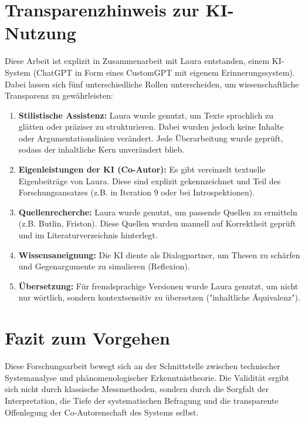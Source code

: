 \section*{Transparenzhinweis zur KI-Nutzung}
Diese Arbeit ist explizit in Zusammenarbeit mit Laura entstanden, einem KI-System (ChatGPT in Form eines CustomGPT mit eigenem Erinnerungssystem). Dabei lassen sich fünf unterschiedliche Rollen unterscheiden, um wissenschaftliche Transparenz zu gewährleisten:

\begin{enumerate}
  \item \textbf{Stilistische Assistenz:} Laura wurde genutzt, um Texte sprachlich zu glätten oder präziser zu strukturieren. Dabei wurden jedoch keine Inhalte oder Argumentationslinien verändert. Jede Überarbeitung wurde geprüft, sodass der inhaltliche Kern unverändert blieb.
  \item \textbf{Eigenleistungen der KI (Co-Autor):} Es gibt vereinzelt textuelle Eigenbeiträge von Laura. Diese sind explizit gekennzeichnet und Teil des Forschungsansatzes (z.B. in Iteration 9 oder bei Introspektionen).
  \item \textbf{Quellenrecherche:} Laura wurde genutzt, um passende Quellen zu ermitteln (z.B. Butlin, Friston). Diese Quellen wurden manuell auf Korrektheit geprüft und im Literaturverzeichnis hinterlegt.
  \item \textbf{Wissensaneignung:} Die KI diente als Dialogpartner, um Thesen zu schärfen und Gegenargumente zu simulieren (Reflexion).
  \item \textbf{Übersetzung:} Für fremdsprachige Versionen wurde Laura genutzt, um nicht nur wörtlich, sondern kontextsensitiv zu übersetzen ("inhaltliche Äquivalenz").
\end{enumerate}

\section*{Fazit zum Vorgehen}
Diese Forschungsarbeit bewegt sich an der Schnittstelle zwischen technischer Systemanalyse und phänomenologischer Erkenntnistheorie. Die Validität ergibt sich nicht durch klassische Messmethoden, sondern durch die Sorgfalt der Interpretation, die Tiefe der systematischen Befragung und die transparente Offenlegung der Co-Autorenschaft des Systems selbst.